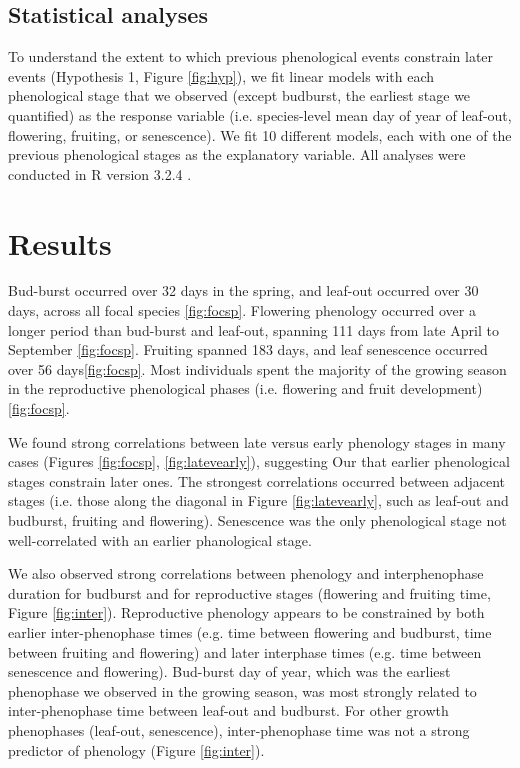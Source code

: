 \documentclass{article}
\begin{document}
\subsection*{Statistical analyses}
To understand the extent to which previous phenological events constrain later events (Hypothesis 1, Figure \ref{fig:hyp}), we fit linear models with each phenological stage that we observed (except budburst, the earliest stage we quantified) as the response variable (i.e. species-level mean day of year of leaf-out, flowering, fruiting, or senescence).  We fit 10 different models, each with one of the previous phenological stages as the explanatory variable. 
All analyses were conducted in R version 3.2.4 \citep{rcoreteam2016}.

\section* {Results}
\par Bud-burst occurred over 32 days in the spring, and leaf-out occurred over 30 days, across all focal species \ref{fig:focsp}. Flowering phenology occurred over a longer period than bud-burst and leaf-out, spanning 111 days from late April to September \ref{fig:focsp}. Fruiting spanned 183 days, and leaf senescence occurred over 56 days\ref{fig:focsp}. Most individuals spent the majority of the growing season in the reproductive phenological phases (i.e. flowering and fruit development) \ref{fig:focsp}.%
\par We found strong correlations between late versus early phenology stages in many cases (Figures \ref{fig:focsp}, \ref{fig:latevearly}), suggesting  Our that earlier phenological stages constrain later ones. The strongest correlations occurred between adjacent stages (i.e. those along the diagonal in Figure \ref{fig:latevearly}, such as leaf-out and budburst, fruiting and flowering). Senescence was the only phenological stage not well-correlated with an earlier phanological stage.
\par We also observed strong correlations between phenology and interphenophase duration for budburst and for reproductive stages (flowering and fruiting time, Figure \ref{fig:inter}). Reproductive phenology appears to be constrained by both earlier inter-phenophase times (e.g. time between flowering and budburst, time between fruiting and flowering) and later interphase times (e.g. time between senescence and flowering). Bud-burst day of year, which was the earliest phenophase we observed in the growing season, was most strongly related to inter-phenophase time between leaf-out and budburst. For other growth phenophases (leaf-out, senescence), inter-phenophase time was not a strong predictor of phenology (Figure \ref{fig:inter}). 
\end{document}
